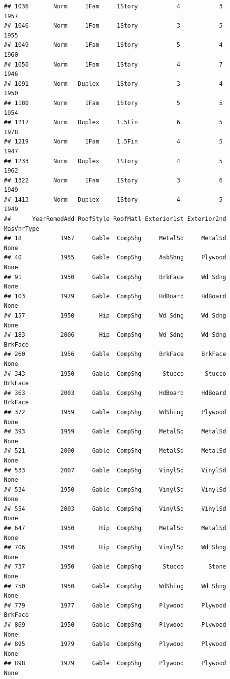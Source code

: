 \documentclass[]{article}
\begin{document}
\begin{verbatim}
## 1036       Norm     1Fam     1Story           4           3      1957
## 1046       Norm     1Fam     1Story           3           5      1955
## 1049       Norm     1Fam     1Story           5           4      1960
## 1050       Norm     1Fam     1Story           4           7      1946
## 1091       Norm   Duplex     1Story           3           4      1950
## 1180       Norm     1Fam     1Story           5           5      1954
## 1217       Norm   Duplex     1.5Fin           6           5      1978
## 1219       Norm     1Fam     1.5Fin           4           5      1947
## 1233       Norm   Duplex     1Story           4           5      1962
## 1322       Norm     1Fam     1Story           3           6      1949
## 1413       Norm   Duplex     1Story           4           5      1949
##      YearRemodAdd RoofStyle RoofMatl Exterior1st Exterior2nd MasVnrType
## 18           1967     Gable  CompShg     MetalSd     MetalSd       None
## 40           1955     Gable  CompShg     AsbShng     Plywood       None
## 91           1950     Gable  CompShg     BrkFace     Wd Sdng       None
## 103          1979     Gable  CompShg     HdBoard     HdBoard       None
## 157          1950       Hip  CompShg     Wd Sdng     Wd Sdng       None
## 183          2006       Hip  CompShg     Wd Sdng     Wd Sdng    BrkFace
## 260          1956     Gable  CompShg     BrkFace     BrkFace       None
## 343          1950     Gable  CompShg      Stucco      Stucco    BrkFace
## 363          2003     Gable  CompShg     HdBoard     HdBoard    BrkFace
## 372          1959     Gable  CompShg     WdShing     Plywood       None
## 393          1959     Gable  CompShg     MetalSd     MetalSd       None
## 521          2000     Gable  CompShg     MetalSd     MetalSd       None
## 533          2007     Gable  CompShg     VinylSd     VinylSd       None
## 534          1950     Gable  CompShg     VinylSd     VinylSd       None
## 554          2003     Gable  CompShg     VinylSd     VinylSd       None
## 647          1950       Hip  CompShg     MetalSd     MetalSd       None
## 706          1950       Hip  CompShg     VinylSd     Wd Shng       None
## 737          1950     Gable  CompShg      Stucco       Stone       None
## 750          1950     Gable  CompShg     WdShing     Wd Shng       None
## 779          1977     Gable  CompShg     Plywood     Plywood    BrkFace
## 869          1950     Gable  CompShg     Plywood     Plywood       None
## 895          1979     Gable  CompShg     Plywood     Plywood       None
## 898          1979     Gable  CompShg     Plywood     Plywood       None

\end{verbatim}
\end{document}
